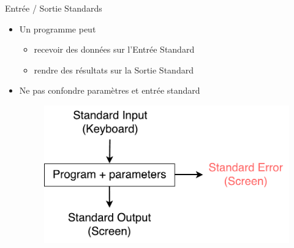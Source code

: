 \documentclass[xcolor=table]{beamer}
\begin{document}
\begin{frame}{Entrée / Sortie Standards}
\begin{itemize}
    \item Un programme peut
    \begin{itemize}
        \item recevoir des données sur l'Entrée Standard
        \item rendre des résultats sur la Sortie Standard
    \end{itemize}
    \item Ne pas confondre paramètres et entrée standard
    \begin{figure}
    \includegraphics[scale=0.5]{fig/in-out.pdf}
    \end{figure}
\end{itemize}
\end{frame}
\end{document}
